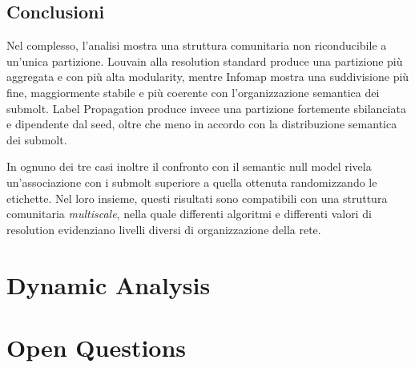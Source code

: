 \documentclass[twocolumn]{article}
\begin{document}
   \subsection{Conclusioni}
   Nel complesso, l'analisi mostra una struttura comunitaria non riconducibile a un'unica partizione. 
   Louvain alla resolution standard produce una partizione più aggregata e con più alta modularity, mentre Infomap mostra una suddivisione più fine, maggiormente stabile e più coerente con l'organizzazione semantica dei submolt. 
   Label Propagation produce invece una partizione fortemente sbilanciata e dipendente dal seed, oltre che meno in accordo con la distribuzione semantica dei submolt.

   In ognuno dei tre casi inoltre il confronto con il semantic null model rivela un'associazione con i submolt superiore a quella ottenuta randomizzando le etichette. 
   Nel loro insieme, questi risultati sono compatibili con una struttura comunitaria \textit{multiscale}, nella quale differenti algoritmi e differenti valori di resolution evidenziano livelli diversi di organizzazione della rete.

   \hrulefill
   \section{Dynamic Analysis}
   \label{sec:dynamic_analysis}

   \hrulefill
   \section{Open Questions}
   \label{sec:open_questions}
\end{document}
